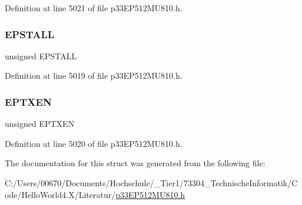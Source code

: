 Definition at line 5021 of file p33\+E\+P512\+M\+U810.\+h.

\mbox{\label{structtag_u1_e_p1_b_i_t_s_a47042104f04ebe06a23f9789bd400d7e}} 
\subsubsection{\texorpdfstring{E\+P\+S\+T\+A\+LL}{EPSTALL}}
{\footnotesize\ttfamily unsigned E\+P\+S\+T\+A\+LL}



Definition at line 5019 of file p33\+E\+P512\+M\+U810.\+h.

\mbox{\label{structtag_u1_e_p1_b_i_t_s_aa2d88c1be513e759c136823c86a355b4}} 
\subsubsection{\texorpdfstring{E\+P\+T\+X\+EN}{EPTXEN}}
{\footnotesize\ttfamily unsigned E\+P\+T\+X\+EN}



Definition at line 5020 of file p33\+E\+P512\+M\+U810.\+h.



The documentation for this struct was generated from the following file\+:\begin{DoxyCompactItemize}
\item 
C\+:/\+Users/00670/\+Documents/\+Hochschule/\+\_\+\+Tier1/73304\+\_\+\+Technische\+Informatik/\+Code/\+Hello\+World4.\+X/\+Literatur/\hyperlink{p33_e_p512_m_u810_8h}{p33\+E\+P512\+M\+U810.\+h}\end{DoxyCompactItemize}
